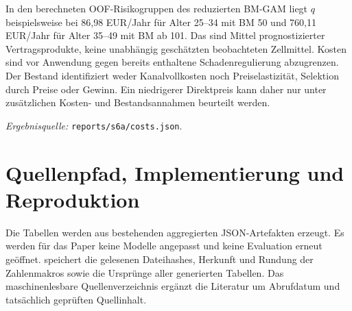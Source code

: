 \documentclass[11pt,a4paper]{article}
\newcommand{\code}[1]{\texttt{\detokenize{#1}}}
\newcommand{\evidence}[1]{\par{\footnotesize\textit{Ergebnisquelle:} \nolinkurl{#1}.}\par}
\begin{document}
In den berechneten OOF-Risikogruppen des reduzierten BM-GAM liegt $q$ beispielsweise bei 86,98 EUR/Jahr für Alter 25--34 mit BM 50 und 760,11 EUR/Jahr für Alter 35--49 mit BM ab 101. Das sind Mittel prognostizierter Vertragsprodukte, keine unabhängig geschätzten beobachteten Zellmittel. Kosten sind vor Anwendung gegen bereits enthaltene Schadenregulierung abzugrenzen. Der Bestand identifiziert weder Kanalvollkosten noch Preiselastizität, Selektion durch Preise oder Gewinn. Ein niedrigerer Direktpreis kann daher nur unter zusätzlichen Kosten- und Bestandsannahmen beurteilt werden.
\evidence{reports/s6a/costs.json}

\clearpage
\section{Quellenpfad, Implementierung und Reproduktion}
Die Tabellen werden aus bestehenden aggregierten JSON-Artefakten erzeugt. Es werden für das Paper keine Modelle angepasst und keine Evaluation erneut geöffnet. \code{paper/evidence.json} speichert die gelesenen Dateihashes, Herkunft und Rundung der Zahlenmakros sowie die Ursprünge aller generierten Tabellen. Das maschinenlesbare Quellenverzeichnis ergänzt die Literatur um Abrufdatum und tatsächlich geprüften Quellinhalt.
\end{document}
